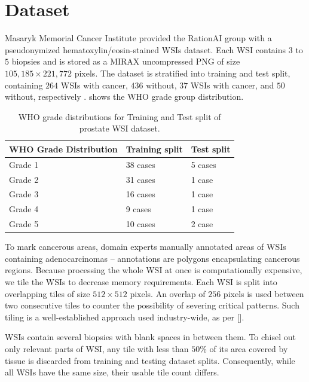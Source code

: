 \section{Dataset}\label{sec:dataset}

Masaryk Memorial Cancer Institute provided the RationAI group with a pseudonymized hematoxylin/eosin-stained WSIs dataset.
Each WSI contains $3$ to $5$ biopsies and is stored as a MIRAX uncompressed PNG of size $105,185 \times 221,772$ pixels.
The dataset is stratified into training and test split, containing $264$ WSIs with cancer, $436$ without, $37$ WSIs with cancer, and $50$ without, respectively \cite{gallo}.
 shows the WHO grade group distribution.

\begin{table}
\centering
{}
\begin{tabular}{@{} l l l @{}}\toprule
WHO Grade Distribution & Training split & Test split \\ 
\midrule
Grade 1         & 38 cases            & 5 cases      \\
Grade 2         & 31 cases            & 1 case       \\
Grade 3         & 16 cases            & 1 case       \\
Grade 4         & 9 cases             & 1 case       \\
Grade 5         & 10 cases            & 2 case       \\
\bottomrule
\end{tabular}
\caption{WHO grade distributions for Training and Test split of prostate WSI dataset.}
\label{tab:who_grade_distribution}
\end{table}

To mark cancerous areas, domain experts manually annotated areas of WSIs containing adenocarcinomas -- annotations are polygons encapsulating cancerous regions.
Because processing the whole WSI at once is computationally expensive, we tile the WSIs to decrease memory requirements.
Each WSI is split into overlapping tiles of size $512 \times 512$ pixels.
An overlap of $256$ pixels is used between two consecutive tiles to counter the possibility of severing critical patterns.
Such tiling is a well-established approach used industry-wide, as per [].

WSIs contain several biopsies with blank spaces in between them.
To chisel out only relevant parts of WSI, any tile with less than $50$\% of its area covered by tissue is discarded from training and testing dataset splits.
Consequently, while all WSIs have the same size, their usable tile count differs.

